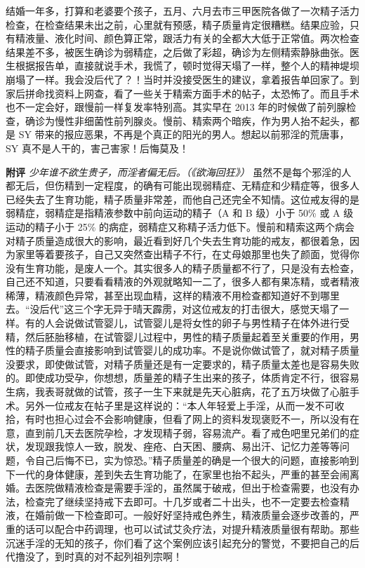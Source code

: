 \begin{case}
    结婚一年多，打算和老婆要个孩子，五月、六月去市三甲医院各做了一次精子活力检查，在检查结果未出之前，心里就有预感，精子质量肯定很糟糕。结果应验，只有精液量、液化时间、颜色算正常，跟活力有关的全都大大低于正常值。两次检查结果差不多，被医生确诊为弱精症，之后做了彩超，确诊为左侧精索静脉曲张。医生根据报告单，直接就说手术，我慌了，顿时觉得天塌了一样，整个人的精神堤坝崩塌了一样。我会没后代了？！当时并没接受医生的建议，拿着报告单回家了。到家后拼命找资料上网查，看了一些关于精索方面手术的帖子，太恐怖了。而且手术也不一定会好，跟慢前一样复发率特别高。其实早在 2013 年的时候做了前列腺检查，确诊为慢性非细菌性前列腺炎。慢前、精索两个暗疾，作为男人抬不起头，都是 SY 带来的报应恶果，不再是个真正的阳光的男人。想起以前邪淫的荒唐事，SY 真不是人干的，害己害家！后悔莫及！

    \textbf{附评} \textit{少年谁不欲生贵子，而淫者偏无后。（《欲海回狂》）} 虽然不是每个邪淫的人都无后，但伤精到一定程度，的确有可能出现弱精症、无精症和少精症等，很多人已经失去了生育功能，精子质量非常差，而他自己还完全不知情。这位戒友得的是弱精症，弱精症是指精液参数中前向运动的精子（A 和 B 级）小于 50\% 或 A 级运动的精子小于 25\% 的病症，弱精症又称精子活力低下。慢前和精索这两个病会对精子质量造成很大的影响，最近看到好几个失去生育功能的戒友，都很着急，因为家里等着要孩子，自己又突然查出精子不行，在丈母娘那里也失了颜面，觉得你没有生育功能，是废人一个。其实很多人的精子质量都不行了，只是没有去检查，自己还不知道，只要看看精液的外观就略知一二了，很多人都有果冻精，或者精液稀薄，精液颜色异常，甚至出现血精，这样的精液不用检查都知道好不到哪里去。“没后代”这三个字无异于晴天霹雳，对这位戒友的打击很大，感觉天塌了一样。有的人会说做试管婴儿，试管婴儿是将女性的卵子与男性精子在体外进行受精，然后胚胎移植，在试管婴儿过程中，男性的精子质量起着至关重要的作用，男性的精子质量会直接影响到试管婴儿的成功率。不是说你做试管了，就对精子质量没要求，即使做试管，对精子质量还是有一定要求的，精子质量太差也是容易失败的。即使成功受孕，你想想，质量差的精子生出来的孩子，体质肯定不行，很容易生病，我表哥就做的试管，孩子一生下来就是先天心脏病，花了五万块做了心脏手术。另外一位戒友在帖子里是这样说的：“本人年轻爱上手淫，从而一发不可收拾，有时也担心过会不会影响健康，但看了网上的资料发现褒贬不一，所以没有在意，直到前几天去医院孕检，才发现精子弱，容易流产。看了戒色吧里兄弟们的症状，发现跟我惊人一致，脱发、痤疮、白天困、腰病、易出汗、记忆力差等等问题，令自己后悔不已，实为惊恐。”精子质量差的确是一个很大的问题，直接影响到下一代的身体健康，差到失去生育功能了，在家里也抬不起头，严重的甚至会闹离婚。去医院做精液检查是需要手淫的，虽然属于破戒，但出于检查需要，也没有办法，检查完了继续坚持戒下去即可。十几岁或者二十出头，也不一定要去检查精液，在婚前做一下检查即可。一般好好坚持戒色养生，精液质量会逐步改善的，严重的话可以配合中药调理，也可以试试艾灸疗法，对提升精液质量很有帮助。那些沉迷手淫的无知的孩子，你们看了这个案例应该引起充分的警觉，不要把自己的后代撸没了，到时真的对不起列祖列宗啊！
\end{case}

